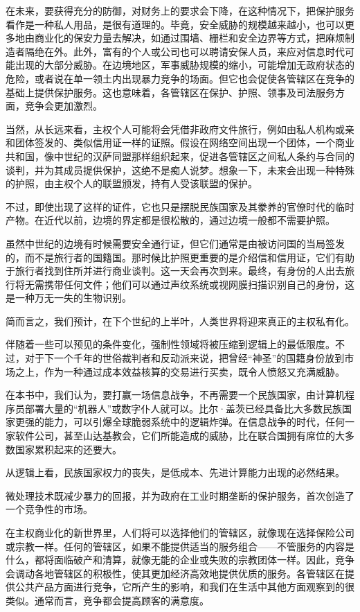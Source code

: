 在未来，要获得充分的防御，对财务上的要求会下降，在这种情况下，把保护服务看作是一种私人用品，是很有道理的。毕竟，安全威胁的规模越来越小，也可以更多地由商业化的保安力量去解决，如通过围墙、栅栏和安全边界等方式，把麻烦制造者隔绝在外。此外，富有的个人或公司也可以聘请安保人员，来应对信息时代可能出现的大部分威胁。在边境地区，军事威胁规模的缩小，可能增加无政府状态的危险，或者说在单一领土内出现暴力竞争的场面。但它也会促使各管辖区在竞争的基础上提供保护服务。这也意味着，各管辖区在保护、护照、领事及司法服务方面，竞争会更加激烈。

当然，从长远来看，主权个人可能将会凭借非政府文件旅行，例如由私人机构或亲和团体签发的、类似信用证一样的证照。假设在网络空间出现一个团体，一个商业共和国，像中世纪的汉萨同盟那样组织起来，促进各管辖区之间私人条约与合同的谈判，并为其成员提供保护，这绝不是痴人说梦。想象一下，未来会出现一种特殊的护照，由主权个人的联盟颁发，持有人受该联盟的保护。

不过，即使出现了这样的证件，它也只是摆脱民族国家及其豢养的官僚时代的临时产物。在近代以前，边境的界定都是很松散的，通过边境一般都不需要护照。

虽然中世纪的边境有时候需要安全通行证，但它们通常是由被访问国的当局签发的，而不是旅行者的国籍国。那时候比护照更重要的是介绍信和信用证，它们有助于旅行者找到住所并进行商业谈判。这一天会再次到来。最终，有身份的人出去旅行将无需携带任何文件；他们可以通过声纹系统或视网膜扫描识别自己的身份，这是一种万无一失的生物识别。

简而言之，我们预计，在下个世纪的上半叶，人类世界将迎来真正的主权私有化。

伴随着一些可以预见的条件变化，强制性领域将被压缩到逻辑上的最低限度。不过，对于下一个千年的世俗裁判者和反动派来说，把曾经“神圣”的国籍身份放到市场之上，作为一种通过成本效益核算的交易进行买卖，既令人愤怒又充满威胁。

在本书中，我们认为，要打赢一场信息战争，不再需要一个民族国家，由计算机程序员部署大量的“机器人”或数字仆人就可以。比尔·盖茨已经具备比大多数民族国家更强的能力，可以引爆全球脆弱系统中的逻辑炸弹。在信息战争的时代，任何一家软件公司，甚至山达基教会，它们所能造成的威胁，比在联合国拥有席位的大多数国家累积起来的还要大。

从逻辑上看，民族国家权力的丧失，是低成本、先进计算能力出现的必然结果。

微处理技术既减少暴力的回报，并为政府在工业时期垄断的保护服务，首次创造了一个竞争性的市场。

在主权商业化的新世界里，人们将可以选择他们的管辖区，就像现在选择保险公司或宗教一样。任何的管辖区，如果不能提供适当的服务组合——不管服务的内容是什么，都将面临破产和清算，就像无能的企业或失败的宗教团体一样。因此，竞争会调动各地管辖区的积极性，使其更加经济高效地提供优质的服务。各管辖区在提供公共产品方面进行竞争，它所产生的影响，和我们在生活中其他方面观察到的很类似。通常而言，竞争都会提高顾客的满意度。


